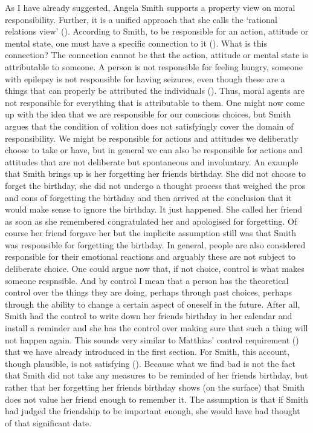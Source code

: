 \documentclass{article}
\newcounter{example}
\begin{document}
As I have already suggested, Angela Smith supports a property view on moral
responsibility. Further, it is a unified approach that she calls the `rational
relations view' (\cite[p. 369]{smith2008control}).
According to Smith, to be responsible for an action, attitude or mental state,
one must have a specific connection to it
(\cite[p 370]{smith2008control}). What is this connection? The connection cannot
be that the action, attitude or mental state is attributable to someone. A
person is not responsible for feeling hungry, someone with epilepsy is not
responsible for having seizures, even though these are a things that can
properly be attributed the individuals (\cite[p.
584]{smith2012attributability}). Thus, moral agents are not responsible for everything
that is attributable to them. One might now come up with the idea that we are
responsible for our conscious choices, but Smith argues that the condition of
volition does not satisfyingly cover the domain of responsibility. We might be
responsible for actions and attitudes we deliberatly choose to take or have,
but in general we can also be responsible for actions and attitudes that are
not deliberate but spontaneous and involuntary. An example that Smith brings up
is her forgetting her friends birthday. She did not choose to forget the
birthday, she did not undergo a thought process that weighed the pros and cons
of forgetting the birthday and then arrived at the conclusion that it would
make sense to ignore the birthday. It just happened. She called her friend as
soon as she remembered congratulated her and apologised for forgetting. Of
course her friend forgave her but the implicite assumption still was that
Smith was responsible for forgetting the birthday. In general, people are also
considered responsible for their emotional reactions and arguably these are not
subject to deliberate choice. One could argue now that, if not choice, control
is what makes someone respnsible. And by control I mean that a person has the
theoretical control over the things they are doing, perhaps through past
choices, perhaps through the ability to change a certain aspect of oneself in
the future. After all, Smith had the control to write down her friends birthday
in her calendar and install a reminder and she has the control over making sure
that such a thing will not happen again. This sounds very similar to Matthias' control
requirement (\cite[p.175]{Matthias_2004}) that we have already introduced in
the first section. For Smith, this account, though plausible, is not satisfying
(\cite[p. 251]{smith2005responsibility}). Because what we find bad is not the
fact that Smith did not take any measures to be reminded of her friends birthday,
but rather that her forgetting her friends birthday shows (on the surface) that
Smith does not value her friend enough to remember it. The assumption is that
if Smith had judged the friendship to be important enough, she would have had
thought of that significant date.
\end{document}
